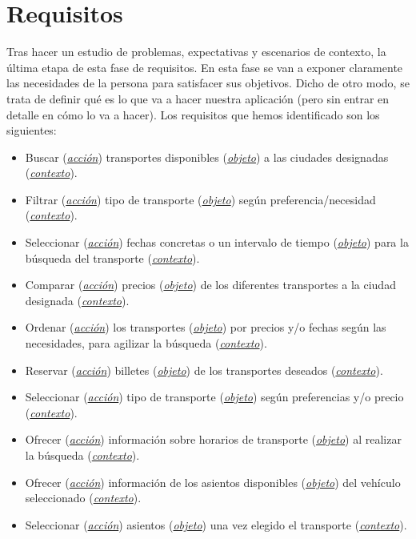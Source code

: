 \section{Requisitos}
Tras hacer un estudio de problemas, expectativas y escenarios de contexto, la última etapa de esta fase de requisitos. En esta fase se van a exponer claramente las 
necesidades de la persona para satisfacer sus objetivos. Dicho de otro modo, se trata de definir qué es lo que va a hacer nuestra aplicación (pero sin entrar en
detalle en cómo lo va a hacer). Los requisitos que hemos identificado son los siguientes:
\begin{itemize}
    \item Buscar (\textit{\underline{acción}}) transportes disponibles (\textit{\underline{objeto}}) a las ciudades designadas (\textit{\underline{contexto}}).
    \item Filtrar (\textit{\underline{acción}}) tipo de transporte (\textit{\underline{objeto}}) según preferencia/necesidad (\textit{\underline{contexto}}).
    \item Seleccionar (\textit{\underline{acción}}) fechas concretas o un intervalo de tiempo (\textit{\underline{objeto}}) para la búsqueda del transporte (\textit{\underline{contexto}}).
    \item Comparar (\textit{\underline{acción}}) precios (\textit{\underline{objeto}}) de los diferentes transportes a la ciudad designada (\textit{\underline{contexto}}).
    \item Ordenar (\textit{\underline{acción}}) los transportes (\textit{\underline{objeto}}) por precios y/o fechas según las necesidades, para agilizar la búsqueda (\textit{\underline{contexto}}).
    \item Reservar (\textit{\underline{acción}}) billetes (\textit{\underline{objeto}}) de los transportes deseados (\textit{\underline{contexto}}).
    \item Seleccionar (\textit{\underline{acción}}) tipo de transporte (\textit{\underline{objeto}}) según preferencias y/o precio (\textit{\underline{contexto}}).
    \item Ofrecer (\textit{\underline{acción}}) información sobre horarios de transporte (\textit{\underline{objeto}}) al realizar la búsqueda (\textit{\underline{contexto}}).
    \item Ofrecer (\textit{\underline{acción}}) información de los asientos disponibles (\textit{\underline{objeto}}) del vehículo seleccionado (\textit{\underline{contexto}}).
    \item Seleccionar (\textit{\underline{acción}}) asientos (\textit{\underline{objeto}}) una vez elegido el transporte (\textit{\underline{contexto}}).

\end{itemize}
